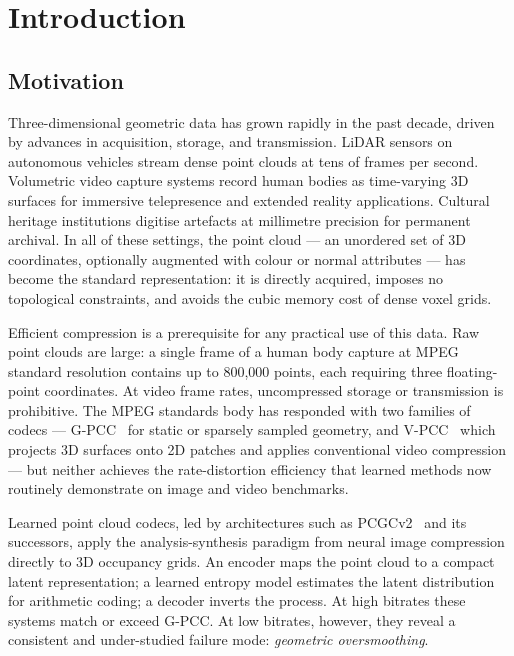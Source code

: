 \chapter{Introduction}
\label{ch:intro}

\section{Motivation}

Three-dimensional geometric data has grown rapidly in the past decade, driven
by advances in acquisition, storage, and transmission.
LiDAR sensors on autonomous vehicles stream dense point clouds at tens of
frames per second.
Volumetric video capture systems record human bodies as time-varying 3D
surfaces for immersive telepresence and extended reality applications.
Cultural heritage institutions digitise artefacts at millimetre precision
for permanent archival.
In all of these settings, the point cloud --- an unordered set of 3D
coordinates, optionally augmented with colour or normal attributes ---
has become the standard representation: it is directly acquired, imposes no
topological constraints, and avoids the cubic memory cost of dense voxel grids.

Efficient compression is a prerequisite for any practical use of this data.
Raw point clouds are large: a single frame of a human body capture at MPEG
standard resolution contains up to 800,000 points, each requiring three
floating-point coordinates.
At video frame rates, uncompressed storage or transmission is prohibitive.
The MPEG standards body has responded with two families of codecs ---
G-PCC~\cite{graziosi2020gpcc} for static or sparsely sampled geometry, and
V-PCC~\cite{schwarz2018emerging} which projects 3D surfaces onto 2D patches
and applies conventional video compression --- but neither achieves the
rate-distortion efficiency that learned methods now routinely demonstrate on
image and video benchmarks.

Learned point cloud codecs, led by architectures such as
PCGCv2~\cite{wang2021multiscale} and its successors, apply the
analysis-synthesis paradigm from neural image compression directly to 3D
occupancy grids.
An encoder maps the point cloud to a compact latent representation; a learned
entropy model estimates the latent distribution for arithmetic coding;
a decoder inverts the process.
At high bitrates these systems match or exceed G-PCC.
At low bitrates, however, they reveal a consistent and under-studied failure
mode: \emph{geometric oversmoothing}.

